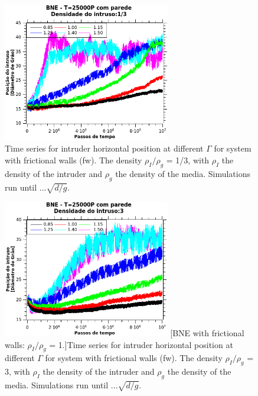 \begin{figure}
    \centering
    \includegraphics[width=0.65\textwidth]{04-figuras/BNE25000D1-3.png}
    \caption[BNE with frictional walls: $\rho_I/\rho_g$ = 1/3.]{Time series for intruder horizontal position at different $\Gamma$ for system with frictional walls (fw). The density $\rho_I/\rho_g$ = 1/3, with $\rho_I$ the density of the intruder and $\rho_g$ the density of the media. Simulations run until $...\sqrt{d/g}$.}
    \label{fig:BNE25000_Parede_Densidade1-3}
\end{figure}

\begin{figure}
    \centering
    \includegraphics[width=0.65\textwidth]{04-figuras/BNE25000D3.png}
    [BNE with frictional walls: $\rho_I/\rho_g$ = 1.]{Time series for intruder horizontal position at different $\Gamma$ for system with frictional walls (fw). The density $\rho_I/\rho_g$ = 3, with $\rho_I$ the density of the intruder and $\rho_g$ the density of the media. Simulations run until $...\sqrt{d/g}$.}
    \label{fig:BNE25000_Parede_Densidade3}
\end{figure}


